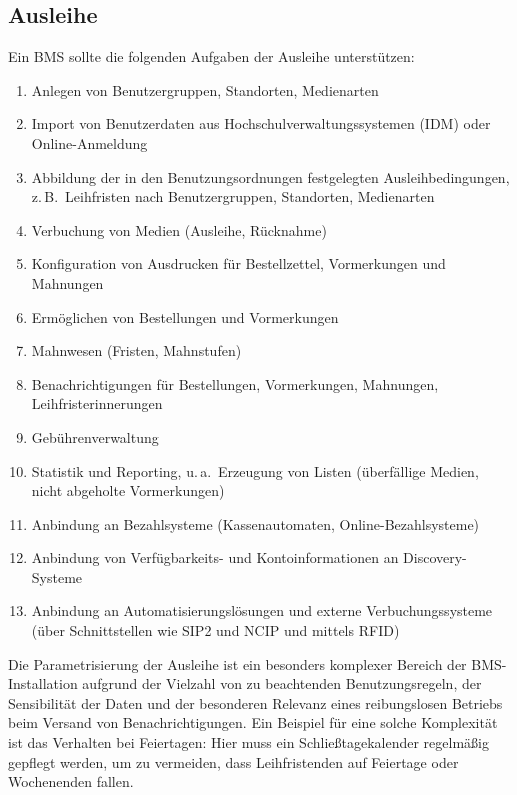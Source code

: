 \documentclass[
  11pt,
  letterpaper,
  DIV=11,
  twoside]{scrreprt}
\begin{document}
\subsection{Ausleihe}\label{ausleihe-prozess}

Ein BMS sollte die folgenden Aufgaben der Ausleihe unterstützen:

\begin{enumerate}
\def\labelenumi{\arabic{enumi}.}
\item
  Anlegen von Benutzergruppen, Standorten, Medienarten
\item
  Import von Benutzerdaten aus Hochschulverwaltungssystemen (IDM) oder
  Online-Anmeldung
\item
  Abbildung der in den Benutzungsordnungen festgelegten
  Ausleihbedingungen, z.\,B.~Leihfristen nach Benutzergruppen,
  Standorten, Medienarten
\item
  Verbuchung von Medien (Ausleihe, Rücknahme)
\item
  Konfiguration von Ausdrucken für Bestellzettel, Vormerkungen und
  Mahnungen
\item
  Ermöglichen von Bestellungen und Vormerkungen
\item
  Mahnwesen (Fristen, Mahnstufen)
\item
  Benachrichtigungen für Bestellungen, Vormerkungen, Mahnungen,
  Leihfristerinnerungen
\item
  Gebührenverwaltung
\item
  Statistik und Reporting, u.\,a.~Erzeugung von Listen (überfällige
  Medien, nicht abgeholte Vormerkungen)
\item
  Anbindung an Bezahlsysteme (Kassenautomaten, Online-Bezahlsysteme)
\item
  Anbindung von Verfügbarkeits- und Kontoinformationen an
  Discovery-Systeme
\item
  Anbindung an Automatisierungslösungen und externe Verbuchungssysteme
  (über Schnittstellen wie SIP2 und NCIP und mittels RFID)
\end{enumerate}

Die Parametrisierung der Ausleihe ist ein besonders komplexer Bereich
der BMS-Installation aufgrund der Vielzahl von zu beachtenden
Benutzungsregeln, der Sensibilität der Daten und der besonderen Relevanz
eines reibungslosen Betriebs beim Versand von Benachrichtigungen. Ein
Beispiel für eine solche Komplexität ist das Verhalten bei Feiertagen:
Hier muss ein Schließtagekalender regelmäßig gepflegt werden, um zu
vermeiden, dass Leihfristenden auf Feiertage oder Wochenenden fallen.
\end{document}
